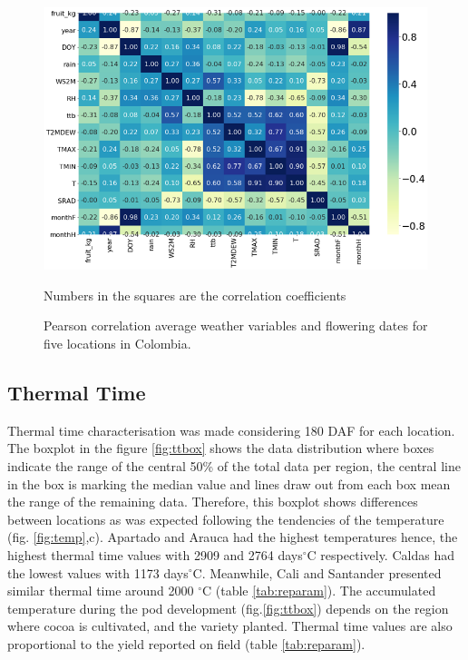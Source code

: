 \documentclass[gene,journal,article,submit,moreauthors,pdftex]{Definitions/mdpi}
\begin{document}
\begin{figure}[h!]
	\centering
	\includegraphics[scale=0.4]{images/heatm.png}\\
	\caption{\footnotesize {Pearson correlation average weather variables and flowering dates for five locations in Colombia. \\}}
	\label{fig:heat} 
	{\footnotesize Numbers in the squares are the correlation coefficients }
\end{figure}
\newpage

\subsection{Thermal Time }

Thermal time characterisation was made considering 180 DAF for each location. The boxplot in the figure \ref{fig:ttbox} shows the data distribution where boxes indicate the range of the central 50\% of the total data per region, the central line in the box is marking the median value and lines draw out from each box mean the range of the remaining data. Therefore, this boxplot shows differences between locations as was expected following the tendencies of the temperature  (fig. \ref{fig:temp},c). Apartado and Arauca had the highest temperatures hence, the highest thermal time values with 2909 and 2764 days$^\circ$C  respectively. Caldas had the lowest values with 1173 days$^\circ$C. Meanwhile, Cali and Santander presented similar thermal time around 2000 $^\circ$C (table \ref{tab:reparam}). The accumulated temperature during the pod development (fig.\ref{fig:ttbox}) depends on the region where cocoa is cultivated, and the variety planted. Thermal time values are also proportional to the yield reported on field (table \ref{tab:reparam}). \\
\end{document}
